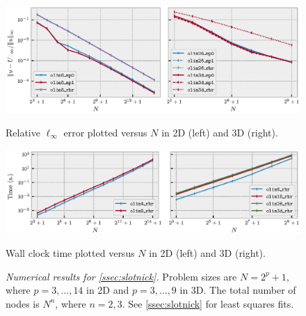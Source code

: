 \documentclass[sisc-eikonal.tex]{subfiles}
\begin{document}
\begin{figure}
  \centering
  \vspace{-1em} \includegraphics[width=\linewidth]{qv_plots.eps}%
  \vspace{-1.5em}
  \caption{Relative $\ell_\infty$ error plotted versus $N$ in 2D
    (left) and 3D (right).}\label{fig:qv}
  \vspace{-1em} \includegraphics[width=\linewidth]{qv-time-plots.eps}%
  \vspace{-1.5em}
  \caption{Wall clock time plotted versus $N$ in 2D (left) and 3D
    (right).}\label{fig:qv-time-plots}
  \vspace{-1em}
  \caption*{\emph{Numerical results for \cref{ssec:slotnick}.} Problem
    sizes are $N = 2^p + 1$, where $p = 3, \hdots, 14$ in 2D and
    $p = 3, \hdots, 9$ in 3D. The total number of nodes is $N^n$,
    where $n = 2, 3$. See \cref{ssec:slotnick} for least squares
    fits.}
\end{figure}
\end{document}
